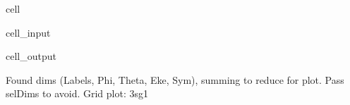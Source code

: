\documentclass[letterpaper,10pt,english]{jupyterBook}
\begin{document}
\begin{sphinxuseclass}{cell}\begin{sphinxVerbatimInput}

\begin{sphinxuseclass}{cell_input}
\begin{sphinxVerbatim}[commandchars=\\\{\}]
     \PYG{p}{[}  \PYG{p}{]} 
\end{sphinxVerbatim}

\end{sphinxuseclass}\end{sphinxVerbatimInput}
\begin{sphinxVerbatimOutput}

\begin{sphinxuseclass}{cell_output}
\begin{sphinxVerbatim}[commandchars=\\\{\}]
Found dims (\PYGZsq{}Labels\PYGZsq{}, \PYGZsq{}Phi\PYGZsq{}, \PYGZsq{}Theta\PYGZsq{}, \PYGZsq{}Eke\PYGZsq{}, \PYGZsq{}Sym\PYGZsq{}), summing to reduce for plot. Pass selDims to avoid.
Grid plot: 3sg\PYGZhy{}1
\end{sphinxVerbatim}

\noindent{}

\end{sphinxuseclass}\end{sphinxVerbatimOutput}

\end{sphinxuseclass}
\end{document}
